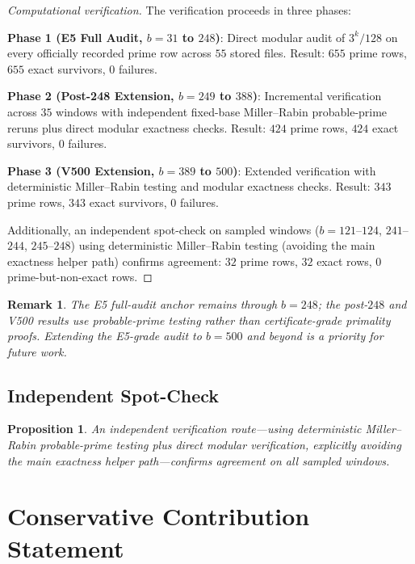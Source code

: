 \documentclass[11pt,letterpaper]{article}
\newtheorem{proposition}[theorem]{Proposition}
\newtheorem{remark}[theorem]{Remark}
\begin{document}
\begin{proof}[Computational verification]
The verification proceeds in three phases:

\textbf{Phase 1 (E5 Full Audit, $b = 31$ to $248$)}: Direct modular audit of $3^k/128$ on every officially recorded prime row across $55$ stored files.
Result: $655$ prime rows, $655$ exact survivors, $0$ failures.

\textbf{Phase 2 (Post-248 Extension, $b = 249$ to $388$)}: Incremental verification across $35$ windows with independent fixed-base Miller--Rabin probable-prime reruns plus direct modular exactness checks.
Result: $424$ prime rows, $424$ exact survivors, $0$ failures.

\textbf{Phase 3 (V500 Extension, $b = 389$ to $500$)}: Extended verification with deterministic Miller--Rabin testing and modular exactness checks.
Result: $343$ prime rows, $343$ exact survivors, $0$ failures.

Additionally, an independent spot-check on sampled windows ($b = 121$--$124$, $241$--$244$, $245$--$248$) using deterministic Miller--Rabin testing (avoiding the main exactness helper path) confirms agreement: $32$ prime rows, $32$ exact rows, $0$ prime-but-non-exact rows.
\end{proof}

\begin{remark}
The E5 full-audit anchor remains through $b = 248$; the post-$248$ and V500 results use probable-prime testing rather than certificate-grade primality proofs.
Extending the E5-grade audit to $b = 500$ and beyond is a priority for future work.
\end{remark}

\subsection{Independent Spot-Check}

\begin{proposition}\label{prop:spotcheck}
An independent verification route---using deterministic Miller--Rabin probable-prime testing plus direct modular verification, explicitly avoiding the main exactness helper path---confirms agreement on all sampled windows.
\end{proposition}

\section{Conservative Contribution Statement}
\end{document}
